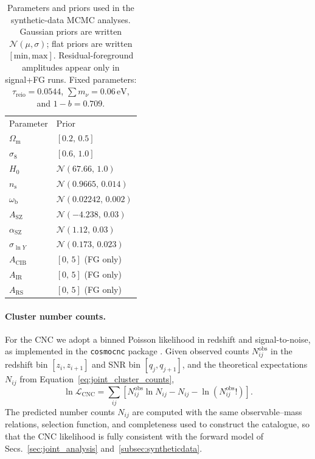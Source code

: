\documentclass[aps,prd,twocolumn,superscriptaddress,nofootinbib,floatfix]{revtex4-2}
\begin{document}
\begin{table}[ht]
\caption{%
Parameters and priors used in the synthetic-data MCMC analyses.
Gaussian priors are written $\mathcal{N}(\mu,\sigma)$; flat priors are written $[\mathrm{min},\mathrm{max}]$.
Residual-foreground amplitudes appear only in signal+FG runs.
Fixed parameters: $\tau_{\mathrm{reio}}=0.0544$, $\sum m_\nu=0.06\,\mathrm{eV}$, and $1-b=0.709$.}
\label{tab:priors}
\renewcommand{\arraystretch}{1.5}
\centering
\begin{ruledtabular}
\begin{tabular}{ll}
Parameter & Prior \\
\colrule
$\Omega_{\mathrm{m}}$ & $[0.2,\,0.5]$ \\
$\sigma_8$ & $[0.6,\,1.0]$ \\
$H_0$ & $\mathcal{N}(67.66,\,1.0)$ \\
$n_{\mathrm{s}}$ & $\mathcal{N}(0.9665,\,0.014)$ \\
$\omega_{\mathrm{b}}$ & $\mathcal{N}(0.02242,\,0.002)$ \\
$A_{\mathrm{SZ}}$ & $\mathcal{N}(-4.238,\,0.03)$ \\
$\alpha_{\mathrm{SZ}}$ & $\mathcal{N}(1.12,\,0.03)$ \\
$\sigma_{\ln Y}$ & $\mathcal{N}(0.173,\,0.023)$ \\
$A_{\mathrm{CIB}}$ & $[0,\,5]$ (FG only) \\
$A_{\mathrm{IR}}$ & $[0,\,5]$ (FG only) \\
$A_{\mathrm{RS}}$ & $[0,\,5]$ (FG only) \\
\end{tabular}
\end{ruledtabular}
\end{table}

\paragraph{Cluster number counts.}
For the CNC we adopt a binned Poisson likelihood in redshift and signal-to-noise, as implemented in the \texttt{cosmocnc} package \citep{ZubeldiaBolliet2024}. Given observed counts $N^{\mathrm{obs}}_{ij}$ in the redshift bin $[z_i,z_{i+1}]$ and SNR bin $[q_j,q_{j+1}]$, and the theoretical expectations $N_{ij}$ from Equation~\ref{eq:joint_cluster_counts},
\begin{equation}
\ln\mathcal{L}_{\mathrm{CNC}}
=
\sum_{ij}
\left[
N^{\mathrm{obs}}_{ij}\ln N_{ij}
-
N_{ij}
-
\ln\!\left(N^{\mathrm{obs}}_{ij}!\right)
\right].
\label{eq:lnLCNC}
\end{equation}
The predicted number counts $N_{ij}$ are computed with the same observable--mass relations, selection function, and completeness used to construct the catalogue, so that the CNC likelihood is fully consistent with the forward model of Secs.~\ref{sec:joint_analysis} and~\ref{subsec:syntheticdata}.
\end{document}
